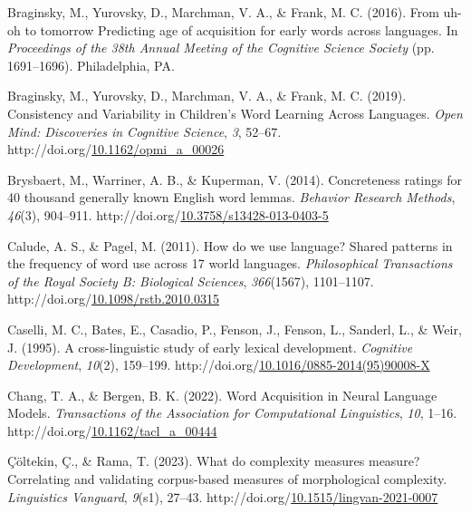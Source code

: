 \documentclass[10pt, letterpaper]{article}
\begin{document}
\begin{CSLReferences}{1}{0}
Braginsky, M., Yurovsky, D., Marchman, V. A., \& Frank, M. C. (2016).
From uh-oh to tomorrow {Predicting} age of acquisition for early words
across languages. In \emph{Proceedings of the 38th {Annual Meeting} of
the {Cognitive Science Society}} (pp. 1691--1696). {Philadelphia, PA}.

Braginsky, M., Yurovsky, D., Marchman, V. A., \& Frank, M. C. (2019).
Consistency and {Variability} in {Children}'s {Word Learning Across
Languages}. \emph{Open Mind: Discoveries in Cognitive Science},
\emph{3}, 52--67.
http://doi.org/\href{https://doi.org/10.1162/opmi_a_00026}{10.1162/opmi\_a\_00026}

Brysbaert, M., Warriner, A. B., \& Kuperman, V. (2014). Concreteness
ratings for 40 thousand generally known {English} word lemmas.
\emph{Behavior Research Methods}, \emph{46}(3), 904--911.
http://doi.org/\href{https://doi.org/10.3758/s13428-013-0403-5}{10.3758/s13428-013-0403-5}

Calude, A. S., \& Pagel, M. (2011). How do we use language? {Shared}
patterns in the frequency of word use across 17 world languages.
\emph{Philosophical Transactions of the Royal Society B: Biological
Sciences}, \emph{366}(1567), 1101--1107.
http://doi.org/\href{https://doi.org/10.1098/rstb.2010.0315}{10.1098/rstb.2010.0315}

Caselli, M. C., Bates, E., Casadio, P., Fenson, J., Fenson, L., Sanderl,
L., \& Weir, J. (1995). A cross-linguistic study of early lexical
development. \emph{Cognitive Development}, \emph{10}(2), 159--199.
http://doi.org/\href{https://doi.org/10.1016/0885-2014(95)90008-X}{10.1016/0885-2014(95)90008-X}

Chang, T. A., \& Bergen, B. K. (2022). Word {Acquisition} in {Neural
Language Models}. \emph{Transactions of the Association for
Computational Linguistics}, \emph{10}, 1--16.
http://doi.org/\href{https://doi.org/10.1162/tacl_a_00444}{10.1162/tacl\_a\_00444}

Çöltekin, Ç., \& Rama, T. (2023). What do complexity measures measure?
{Correlating} and validating corpus-based measures of morphological
complexity. \emph{Linguistics Vanguard}, \emph{9}(s1), 27--43.
http://doi.org/\href{https://doi.org/10.1515/lingvan-2021-0007}{10.1515/lingvan-2021-0007}


\end{CSLReferences}
\end{document}
